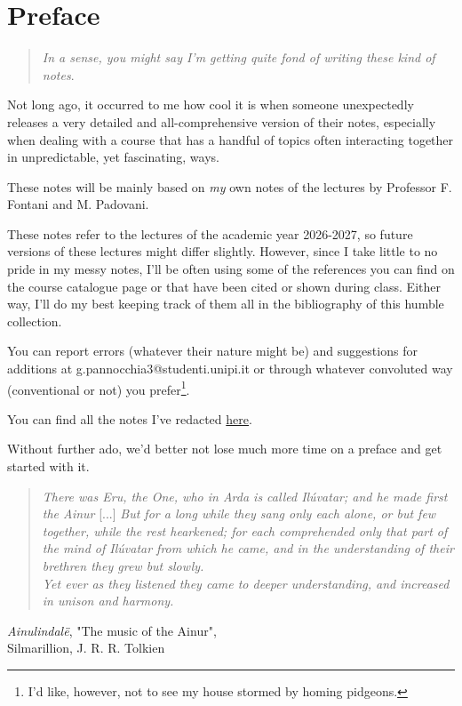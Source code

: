 \chapter*{Preface}

\begin{quote}
    \emph{In a sense, you might say I'm getting quite fond of writing these kind of notes}.
\end{quote}
Not long ago, it occurred to me how cool it is when someone unexpectedly releases a very detailed and all-comprehensive version of their notes, especially when dealing with a course that has a handful of topics often interacting together in unpredictable, yet fascinating, ways.
\par These notes will be mainly based on \emph{my} own notes of the lectures by Professor F. Fontani and M. Padovani.
\par These notes refer to the lectures of the academic year 2026-2027, so future versions of these lectures might differ slightly. However, since I take little to no pride in my messy notes, I'll be often using some of the references you can find on the course catalogue page or that have been cited or shown during class. Either way, I'll do my best keeping track of them all in the bibliography of this humble collection.
\par You can report errors (whatever their nature might be) and suggestions for additions at g.pannocchia3@studenti.unipi.it or through whatever convoluted way (conventional or not) you prefer\footnote{I'd like, however, not to see my house stormed by homing pidgeons.}.
\par You can find all the notes I've redacted \href{https://github.com/gpannocchia3}{here}.
\par Without further ado, we'd better not lose much more time on a preface and get started with it.
\begin{quote}
    \emph{There was Eru, the One, who in Arda is called Ilúvatar; and he made first the Ainur} [...] \emph{But for a long while they sang only each alone, or but few together, while the rest hearkened; for each comprehended only that part of the mind of Ilúvatar from which he came, and in the understanding of their brethren they grew but slowly. \\
    Yet ever as they listened they came to deeper understanding, and increased in unison and harmony.}
\end{quote}

\begin{flushright}
    \emph{Ainulindalë}, "The music of the Ainur",\\
    Silmarillion, J. R. R. Tolkien
\end{flushright}